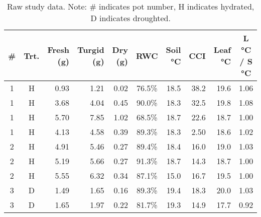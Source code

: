\documentclass{report}
\begin{document}
\begin{table}[h]
    \caption{Raw study data. Note: \# indicates pot number, H indicates hydrated, D indicates droughted.}
    \begin{tabular}{cc||r|r|r|c|r|r|r|c}
    \textbf{\#} & \textbf{Trt.} & \textbf{Fresh (g)} & \textbf{Turgid (g)} & \textbf{Dry (g)} & \textbf{RWC} & \textbf{Soil °C} & \textbf{CCI} & \textbf{Leaf °C} & \textbf{L °C / S °C} \\ \hline
    1            & H             & 0.93               & 1.21                & 0.02             & 76.5\%            & 18.5                     & 38.2         & 19.6                     & 1.06         \\ \hline
    1            & H             & 3.68               & 4.04                & 0.45             & 90.0\%            & 18.3                     & 32.5         & 19.8                     & 1.08         \\ \hline
    1            & H             & 5.70               & 7.85                & 1.02             & 68.5\%            & 18.7                     & 22.6         & 18.7                     & 1.00         \\ \hline
    1            & H             & 4.13               & 4.58                & 0.39             & 89.3\%            & 18.3                     & 2.50         & 18.6                     & 1.02         \\ \hline
    2            & H             & 4.91               & 5.46                & 0.27             & 89.4\%            & 18.4                     & 16.0         & 19.0                     & 1.03         \\ \hline
    2            & H             & 5.19               & 5.66                & 0.27             & 91.3\%            & 18.7                     & 14.3         & 18.7                     & 1.00         \\ \hline
    2            & H             & 5.55               & 6.32                & 0.34             & 87.1\%            & 15.0                     & 16.7         & 19.5                     & 1.00         \\ \hline
    3            & D             & 1.49               & 1.65                & 0.16             & 89.3\%            & 19.4                     & 18.3         & 20.0                     & 1.03         \\ \hline
    3            & D             & 1.65               & 1.97                & 0.22             & 81.7\%            & 19.3                     & 14.9         & 17.7                     & 0.92         \\ \hline

\end{tabular}
\end{table}
\end{document}
